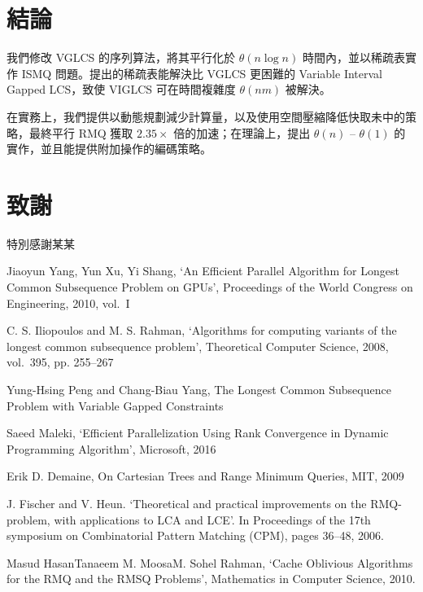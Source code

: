 \documentclass{gapd}
\begin{document}
\section{結論}
\label{sec:Conclusion}

我們修改 VGLCS 的序列算法，將其平行化於 $\theta(n \log n)$ 時間內，並以稀疏表實作 ISMQ 問題。提出的稀疏表能解決比 VGLCS 更困難的 Variable Interval Gapped LCS，致使 VIGLCS 可在時間複雜度 $\theta(nm)$ 被解決。

在實務上，我們提供以動態規劃減少計算量，以及使用空間壓縮降低快取未中的策略，最終平行 RMQ 獲取 $2.35 \times$ 倍的加速；在理論上，提出 $\theta(n)$ -- $\theta(1)$ 的實作，並且能提供附加操作的編碼策略。

\section*{致謝}

特別感謝某某

\begin{thebibliography}{4}

 Jiaoyun Yang, Yun Xu, Yi Shang, `An Efficient Parallel Algorithm for Longest Common Subsequence Problem on GPUs', Proceedings of the World Congress on Engineering, 2010, vol.~I 

 C. S. Iliopoulos and M. S. Rahman, `Algorithms for computing variants of the longest common subsequence problem', Theoretical Computer Science, 2008, vol.~395, pp. 255--267

 Yung-Hsing Peng and Chang-Biau Yang, The Longest Common Subsequence Problem with Variable Gapped Constraints

 Saeed Maleki, `Efficient Parallelization Using Rank Convergence in Dynamic Programming Algorithm', Microsoft, 2016

 Erik D. Demaine, On Cartesian Trees and Range Minimum Queries, MIT, 2009

 J. Fischer and V. Heun. `Theoretical and practical improvements on the RMQ-problem, with applications to LCA and LCE'. In Proceedings of the 17th symposium on Combinatorial Pattern Matching (CPM), pages 36–48, 2006.

 Masud HasanTanaeem M. MoosaM. Sohel Rahman, `Cache Oblivious Algorithms for the RMQ and the RMSQ Problems', Mathematics in Computer Science, 2010.

\end{thebibliography}
\end{document}
